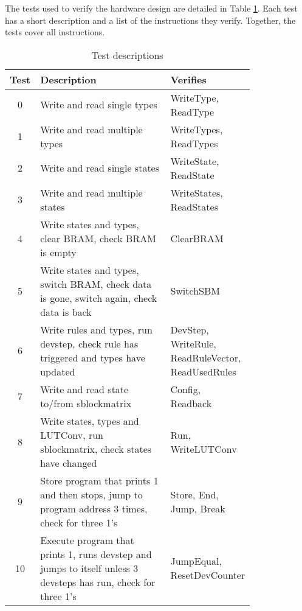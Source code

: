 The tests used to verify the hardware design are detailed in Table \ref{tab:tests}.
Each test has a short description and a list of the instructions they verify.
Together, the tests cover all instructions.

\begin{table}[!ht]
    \renewcommand{\arraystretch}{1.3}
    \caption{Test descriptions}
    \label{tab:tests}
    \centering
    \begin{tabular}{c|p{0.55\linewidth}|p{0.25\linewidth}}
        \bfseries Test & \bfseries Description & \bfseries Verifies \\
        \hline
        0 & Write and read single types & WriteType, ReadType \\
        1 & Write and read multiple types & WriteTypes, ReadTypes \\
        2 & Write and read single states & WriteState, ReadState \\
        3 & Write and read multiple states & WriteStates, ReadStates \\
        4 & Write states and types, clear BRAM, check BRAM is empty & ClearBRAM \\
        5 & Write states and types, switch BRAM, check data is gone, switch again, check data is back & SwitchSBM \\
        6 & Write rules and types, run devstep, check rule has triggered and types have updated & DevStep, WriteRule, ReadRuleVector, ReadUsedRules \\
        7 & Write and read state to/from sblockmatrix & Config, Readback \\
        8 & Write states, types and LUTConv, run sblockmatrix, check states have changed & Run, WriteLUTConv \\
        9 & Store program that prints 1 and then stops, jump to program address 3 times, check for three 1's & Store, End, Jump, Break \\
        10 & Execute program that prints 1, runs devstep and jumps to itself unless 3 devsteps has run, check for three 1's & JumpEqual, ResetDevCounter \\
    \end{tabular}
\end{table}

